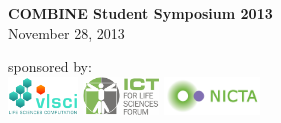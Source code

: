 \documentclass[svgnames]{beamer}
\newcommand{\bp}[1]{{\usebeamercolor[fg]{title}#1}}
\begin{document}
\begin{frame}
    \centering
    \vfill
    {\LARGE \bp{\bfseries COMBINE Student Symposium 2013}}\\[1ex]
    {November 28, 2013}\\
    \vfill
    \begin{minipage}[c]{\linewidth}
        \centering
        sponsored by:\\
        \includegraphics[height=10mm,valign=T]{./images/logo_vlsci_3508x1890.jpg}
        \qquad
        \includegraphics[height=10mm,valign=T]{./images/ICT-for-Life-Sciences-Forum-logo.png}
        \qquad
        \includegraphics[height=10mm,valign=T]{./images/nicta_logo.png}
    \end{minipage}
\end{frame}
\end{document}
